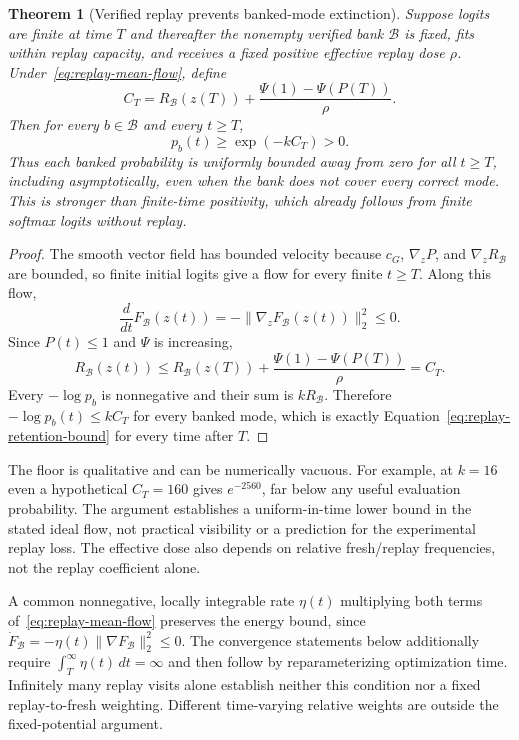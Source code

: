 \documentclass{article}
\newcommand{\1}{\mathbf 1}
\newtheorem{theorem}[lemma]{Theorem}
\theoremstyle{remark}
\theoremstyle{definition}
\theoremstyle{plain}
\begin{document}
\begin{theorem}[Verified replay prevents banked-mode extinction]
\label{thm:replay-retention}
Suppose logits are finite at time $T$ and thereafter the nonempty verified
bank $\mathcal B$ is fixed, fits within replay capacity, and receives a
fixed positive effective replay dose $\rho$. Under~\eqref{eq:replay-mean-flow}, define
\[
  C_T
  =R_{\mathcal B}(z(T))
   +\frac{\Psi(1)-\Psi(P(T))}{\rho}.
\]
Then for every $b\in\mathcal B$ and every $t\ge T$,
\begin{equation}
  p_b(t)\ge \exp(-kC_T)>0.
  \label{eq:replay-retention-bound}
\end{equation}
Thus each banked probability is uniformly bounded away from zero for all
$t\ge T$, including asymptotically, even when the bank does not cover every
correct mode. This is stronger than finite-time positivity, which already
follows from finite softmax logits without replay.
\end{theorem}

\begin{proof}
The smooth vector field has bounded velocity because $c_G$,
$\nabla_zP$, and $\nabla_zR_{\mathcal B}$ are bounded, so finite initial
logits give a flow for every finite $t\ge T$. Along this flow,
\[
  \frac{d}{dt}F_{\mathcal B}(z(t))
  =-\lVert\nabla_zF_{\mathcal B}(z(t))\rVert_2^2\le0.
\]
Since $P(t)\le1$ and $\Psi$ is increasing,
\[
  R_{\mathcal B}(z(t))
  \le R_{\mathcal B}(z(T))
     +\frac{\Psi(1)-\Psi(P(T))}{\rho}
  =C_T.
\]
Every $-\log p_b$ is nonnegative and their sum is
$kR_{\mathcal B}$. Therefore
$-\log p_b(t)\le kC_T$ for every banked mode, which is exactly
Equation~\eqref{eq:replay-retention-bound} for every time after $T$.
\end{proof}


The floor is qualitative and can be numerically vacuous. For example, at
$k=16$ even a hypothetical $C_T=160$ gives $e^{-2560}$, far below any useful
evaluation probability. The argument establishes a uniform-in-time lower
bound in the stated ideal flow, not practical visibility or a prediction for
the experimental replay loss. The effective dose also depends on relative
fresh/replay frequencies, not the replay coefficient alone.

A common nonnegative, locally integrable rate $\eta(t)$ multiplying both
terms of~\eqref{eq:replay-mean-flow} preserves the energy bound, since
$\dot F_{\mathcal B}=-\eta(t)\|\nabla F_{\mathcal B}\|_2^2\le0$.
The convergence statements below additionally require
$\int_T^\infty\eta(t)\,dt=\infty$ and then follow by reparameterizing
optimization time. Infinitely many replay visits alone establish neither
this condition nor a fixed replay-to-fresh weighting. Different time-varying
relative weights are outside the fixed-potential argument.
\end{document}
